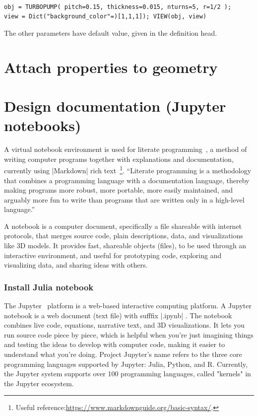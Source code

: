 \begin{coding}
\begin{coding}\ 
\begin{lstlisting}[language=JuliaLocal, style=julia, mathescape=true]
obj = TURBOPUMP( pitch=0.15, thickness=0.015, nturns=5, r=1/2 );
view = Dict("background_color"=)[1,1,1]); VIEW(obj, view)
\end{lstlisting}
The other parameters have default value, given in the definition head.
\end{coding}



\section{Attach properties to geometry}\label{sect:4-4}


\section{Design documentation (Jupyter notebooks)}\label{sect:4-5}

A virtual notebook environment is used for literate programming~\cite{10.1093.27.2.97}, a method of writing computer programs together with explanations and documentation, currently using |Markdown| rich text~\footnote{Useful reference:\href{https://www.markdownguide.org/basic-syntax/}{https://www.markdownguide.org/basic-syntax/}.}. “Literate programming is a methodology that combines a programming language with a documentation language, thereby making programs more robust, more portable, more easily maintained, and arguably more fun to write than programs that are written only in a high-level language.”~\cite{Knuth:92}


A notebook is a computer document, specifically a file shareable with internet protocols, that merges source code, plain descriptions, data, and visualizations like 3D models. It provides fast, shareable objects (files), to be used through an interactive environment, and useful for prototyping code, exploring and visualizing data, and sharing ideas with others.

\subsubsection*{Install Julia notebook}\label{sect:4-5-1}


The Jupyter~\cite{} platform is a web-based interactive computing platform. 
A Jupyter notebook is a web document (text file) with sufffix |.ipynb| .
The notebook combines live code, equations, narrative text, and 3D visualizations. It lets you run source code piece by piece, which is helpful when you're just imagining things and testing the ideas to develop with computer code, making it easier to understand what you're doing.
Project Jupyter's name refers to the three core programming languages supported by Jupyter: Julia, Python, and R. Currently, the Jupyter system supports over 100 programming languages, called "kernels" in the Jupyter ecosystem.


\end{coding}
